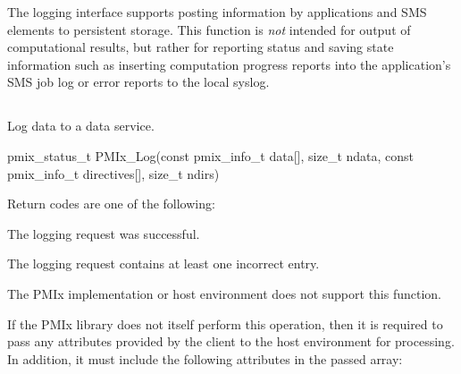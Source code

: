 The logging interface supports posting information by applications and SMS elements to persistent storage. This function is \textit{not} intended for output of computational results, but rather for reporting status and saving state information such as inserting computation progress reports into the application's \ac{SMS} job log or error reports to the local syslog.

\subsection{}

\summary

Log data to a data service.

\format

\cspecificstart
\begin{codepar}
pmix_status_t
PMIx_Log(const pmix_info_t data[], size_t ndata,
         const pmix_info_t directives[], size_t ndirs)
\end{codepar}
\cspecificend

\begin{arglist}
\end{arglist}

Return codes are one of the following:

\begin{constantdesc}
    \item {} The logging request was successful.
    \item {} The logging request contains at least one incorrect entry.
    \item {} The \ac{PMIx} implementation or host environment does not support this function.
\end{constantdesc}

\reqattrstart
If the \ac{PMIx} library does not itself perform this operation, then it is required to pass any attributes provided by the client to the host environment for processing. In addition, it must include the following attributes in the passed  array:


